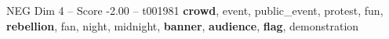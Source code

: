 \begin{textsample}{NEG Dim 4 – Score -2.00 – t001981}  \label{ex:f4_neg_018}
\textbf{crowd}, event, public\_event, protest, fun, \textbf{rebellion}, fan, night, midnight, \textbf{banner}, \textbf{audience}, \textbf{flag}, demonstration

\end{textsample}
